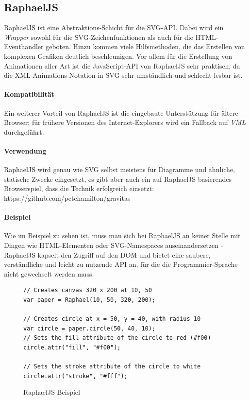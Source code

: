 \documentclass[a4paper, 12pt]{article}
\begin{document}
\subsection{RaphaelJS}
RaphaelJS ist eine Abstraktions-Schicht für die SVG-API. Dabei wird ein \emph{Wrapper} sowohl für die SVG-Zeichenfunktionen als auch für die HTML-Eventhandler geboten. Hinzu kommen viele Hilfsmethoden, die das Erstellen von komplexen Grafiken deutlich beschleunigen. Vor allem für die Erstellung von Animationen aller Art ist die JavaScript-API von RaphaelJS sehr praktisch, da die XML-Animations-Notation in SVG sehr umständlich und schlecht lesbar ist.
\paragraph{Kompatibilität} Ein weiterer Vorteil von RaphaelJS ist die eingebaute Unterstützung für ältere Browser; für frühere Versionen des Internet-Explorers wird ein Fallback auf \emph{VML} durchgeführt.
\paragraph{Verwendung} RaphaelJS wird genau wie SVG selbst meistens für Diagramme und ähnliche, statische Zwecke eingesetzt, es gibt aber auch ein auf RaphaelJS basierendes Browserspiel, dass die Technik erfolgreich einsetzt: https://github.com/petehamilton/gravitas
\paragraph{Beispiel}
Wie im Beispiel zu sehen ist, muss man sich bei RaphaelJS an keiner Stelle mit Dingen wie HTML-Elementen oder SVG-Namespaces auseinandersetzen - RaphaelJS kapselt den Zugriff auf den DOM und bietet eine saubere, verständliche und leicht zu nutzende API an, für die die Programmier-Sprache nicht gewechselt werden muss. 
\begin{figure}[H]
	\begin{verbatim}
// Creates canvas 320 x 200 at 10, 50
var paper = Raphael(10, 50, 320, 200);

// Creates circle at x = 50, y = 40, with radius 10
var circle = paper.circle(50, 40, 10);
// Sets the fill attribute of the circle to red (#f00)
circle.attr("fill", "#f00");

// Sets the stroke attribute of the circle to white
circle.attr("stroke", "#fff");	
	\end{verbatim}
	\caption{RaphaelJS Beispiel}
	\label{raphaeljs_example}
\end{figure}
\newpage
\end{document}
